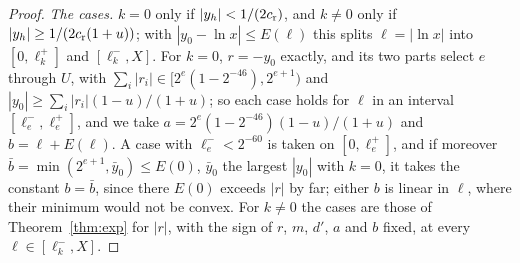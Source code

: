 \begin{proof}
\emph{The cases.} $k = 0$ only if $|y_h| < 1/(2c_{\rm r})$, and $k \ne 0$ only if $|y_h| \ge 1/(2c_{\rm r}(1+u))$; with
$|y_0 - \ln x| \le E(\ell)$ this splits $\ell = |\ln x|$ into $[0, \ell_k^+]$ and $[\ell_k^-, X]$. For $k = 0$, $r =
-y_0$ exactly, and its two parts select $e$ through $U$, with $\sum_i|r_i| \in [2^e(1 - 2^{-46}), 2^{e+1})$ and $|y_0|
\ge \sum_i|r_i|(1-u)/(1+u)$; so each case holds for $\ell$ in an interval $[\ell_e^-, \ell_e^+]$, and we take $a = 2^e(1
- 2^{-46})(1-u)/(1+u)$ and $b = \ell + E(\ell)$. A case with $\ell_e^- < 2^{-60}$ is taken on $[0, \ell_e^+]$, and if
moreover $\bar b = \min(2^{e+1}, \bar y_0) \le E(0)$, $\bar y_0$ the largest $|y_0|$ with $k = 0$, it takes the constant
$b = \bar b$, since there $E(0)$ exceeds $|r|$ by far; either $b$ is linear in $\ell$, where their minimum would not be
convex. For $k \ne 0$ the cases are those of Theorem~\ref{thm:exp} for $|r|$, with the sign of $r$, $m$, $d'$, $a$ and $b$
fixed, at every $\ell \in [\ell_k^-, X]$.


\end{proof}
